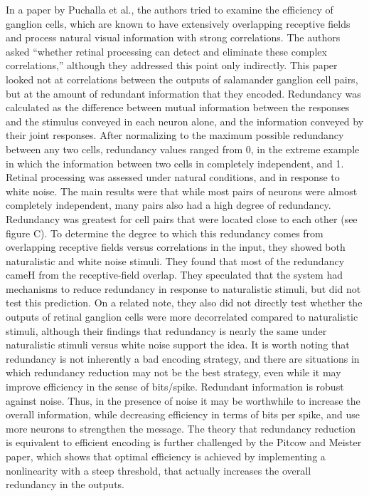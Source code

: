 \documentclass[12pt]{article}
\begin{document}
In a paper by Puchalla et al., the authors tried to examine the efficiency of ganglion cells, which are known to have extensively overlapping receptive fields and process natural visual information with strong correlations. The authors asked “whether retinal processing can detect and eliminate these complex correlations,” although they addressed this point only indirectly. This paper looked not at correlations between the outputs of salamander ganglion cell pairs, but at the amount of redundant information that they encoded. Redundancy was calculated as the difference between mutual information between the responses and the stimulus conveyed in each neuron alone, and the information conveyed by their joint responses. After normalizing to the maximum possible redundancy between any two cells, redundancy values ranged from 0, in the extreme example in which the information between two cells in completely independent, and 1. Retinal processing was assessed under natural conditions, and in response to white noise. The main results were that while most pairs of neurons were almost completely independent, many pairs also had a high degree of redundancy. Redundancy was greatest for cell pairs that were located close to each other (see figure C). To determine the degree to which this redundancy comes from overlapping receptive fields versus correlations in the input, they showed both naturalistic and white noise stimuli. They found that most of the redundancy cameH from the receptive-field overlap. They speculated that the system had mechanisms to reduce redundancy in response to naturalistic stimuli, but did not test this prediction. On a related note, they also did not directly test whether the outputs of retinal ganglion cells were more decorrelated compared to naturalistic stimuli, although their findings that redundancy is nearly the same under naturalistic stimuli versus white noise support the idea. It is worth noting that redundancy is not inherently a bad encoding strategy, and there are situations in which redundancy reduction may not be the best strategy, even while it may improve efficiency in the sense of bits/spike. Redundant information is robust against noise. Thus, in the presence of noise it may be worthwhile to increase the overall information, while decreasing efficiency in terms of bits per spike, and use more neurons to strengthen the message. The theory that redundancy reduction is equivalent to efficient encoding is further challenged by the Pitcow and Meister paper, which shows that optimal efficiency is achieved by implementing a nonlinearity with a steep threshold, that actually increases the overall redundancy in the outputs.
\end{document}

